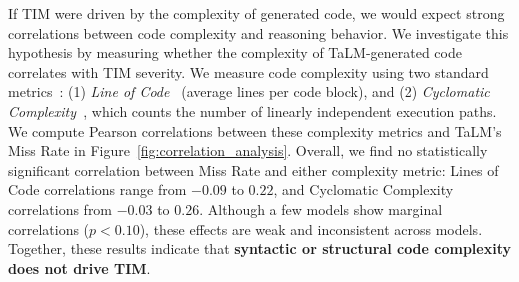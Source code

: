 \documentclass[11pt]{article}
\def \task{\textsc{TIM}\xspace}
\begin{document}
If \task{} were driven by the complexity of generated code, we would expect strong correlations between code complexity and reasoning behavior. We investigate this hypothesis by measuring whether the complexity of TaLM-generated code correlates with \task{} severity. We measure code complexity using two standard metrics~\citep{dou2024s,chen2024survey}: (1) \emph{Line of Code~\citep{Boehm1981}} (average lines per code block), and (2) \emph{Cyclomatic Complexity~\citep{cyclomatic_complexity}}, which counts the number of linearly independent execution paths.
We compute Pearson correlations between these complexity metrics and TaLM's Miss Rate in Figure~\ref{fig:correlation_analysis}. 
Overall, we find no statistically significant correlation between Miss Rate and either complexity metric: Lines of Code correlations range from $-0.09$ to $0.22$, and Cyclomatic Complexity correlations from $-0.03$ to $0.26$. Although a few models show marginal correlations ($p<0.10$), these effects are weak and inconsistent across models. Together, these results indicate that \textbf{syntactic or structural code complexity does not drive \task{}}.
\end{document}
